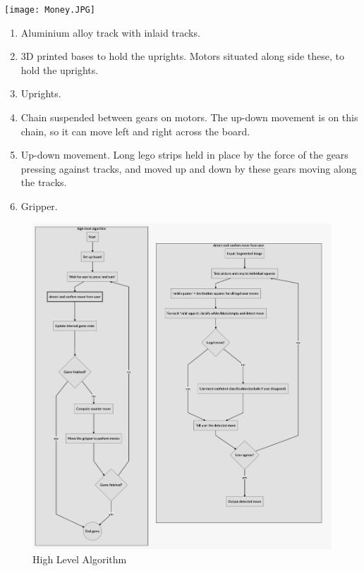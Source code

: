 \documentclass[onecolumn]{IEEEtran}
\begin{document}
\begin{center}
\begin{minipage}[c]{.5\textwidth}
  \texttt{[image: Money.JPG]}
   \label{fig:money}
\end{minipage}
\begin{minipage}[c]{.45\textwidth}
\begin{enumerate}
\item Aluminium alloy track with inlaid tracks.
\item 3D printed bases to hold the uprights. Motors situated along side these, to hold the uprights. 
\item Uprights. 
\item Chain suspended between gears on motors. The up-down movement is on this chain, so it can move left and right across the board. 
\item Up-down movement. Long lego strips held in place by the force of the gears pressing against tracks, and moved up and down by these gears moving along the tracks. 
\item Gripper. 
\end{enumerate}
\end{minipage}
\end{center}

\begin{figure}[h!]
  \caption{High Level Algorithm}
  \centering
  \includegraphics[scale = .3]{white_square.png}
\end{figure}
\end{document}

